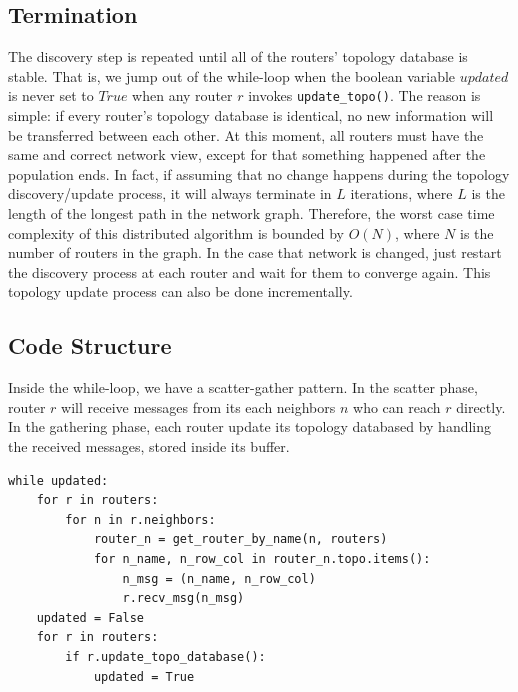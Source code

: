 \documentclass[12pt]{article}  %
\theoremstyle{definition}
\theoremstyle{remark}
\begin{document}
\subsection{Termination}
The discovery step is repeated until all of the routers' topology database is stable.
That is, we jump out of the while-loop when the boolean variable $updated$ is never set to $True$ when any router $r$ invokes \texttt{update\_topo()}.
The reason is simple: if every router's topology database is identical, no new information will be transferred between each other.
At this moment, all routers must have the same and correct network view, except for that something happened after the population ends.
In fact, if assuming that no change happens during the topology discovery/update process, it will always terminate in $L$ iterations, where $L$ is the length of the longest path in the network graph.
Therefore, the worst case time complexity of this distributed algorithm is bounded by $O(N)$, where $N$ is the number of routers in the graph.
In the case that network is changed, just restart the discovery process at each router and wait for them to converge again.
This topology update process can also be done incrementally.

\subsection{Code Structure}
Inside the while-loop, we have a scatter-gather pattern.
In the scatter phase, router $r$ will receive messages from its each neighbors $n$ who can reach $r$ directly.
In the gathering phase, each router update its topology databased by handling the received messages, stored inside its buffer.

\begin{lstlisting}
while updated:
    for r in routers:
        for n in r.neighbors:
            router_n = get_router_by_name(n, routers)
            for n_name, n_row_col in router_n.topo.items():
                n_msg = (n_name, n_row_col)
                r.recv_msg(n_msg)
    updated = False
    for r in routers:
        if r.update_topo_database():
            updated = True
\end{lstlisting}
\end{document}
